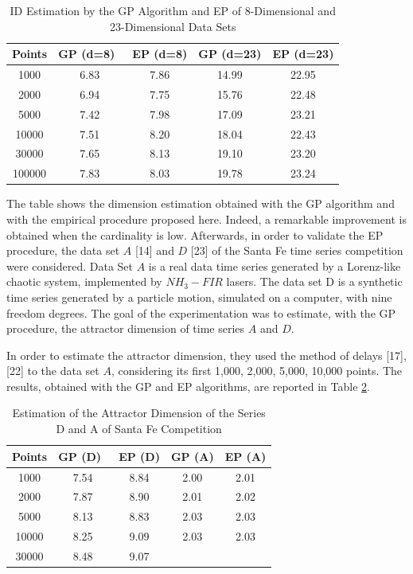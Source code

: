 \documentclass[journal]{IEEEtran}
\begin{document}
\begin{table}[!t]
  \renewcommand{\arraystretch}{2.5}
  \caption{ID Estimation by the GP Algorithm and EP of 8-Dimensional and 23-Dimensional Data Sets}
  \label{tbl_gp_ep_comp}
  \centering
  \begin{tabular}{c||c||c||c||c}
  \hline
  \bfseries Points & \bfseries GP (d=8)\ & \bfseries EP (d=8) & \bfseries GP (d=23) & \bfseries EP (d=23)\\
  \hline\hline
  1000 & 6.83 & 7.86 & 14.99 & 22.95\\
  2000 & 6.94 & 7.75 & 15.76 & 22.48\\
  5000 & 7.42 & 7.98 & 17.09 & 23.21\\
  10000 & 7.51 & 8.20 & 18.04 & 22.43\\
  30000 & 7.65 & 8.13 & 19.10 & 23.20\\
  100000 & 7.83 & 8.03 & 19.78 & 23.24\\
  \hline
  \end{tabular}
\end{table}


The table shows the dimension estimation obtained with the GP algorithm and with the empirical procedure proposed here.
Indeed, a remarkable improvement is obtained when the cardinality is low. Afterwards, in order to validate the EP procedure, 
the data set \(A\) [14] and \(D\) [23] of the Santa Fe time series competition were considered.
Data Set \(A\) is a real data time series generated by a Lorenz-like chaotic system, implemented by \(NH_3-FIR\) lasers. 
The data set D is a synthetic time series generated by a particle motion, simulated on a computer, with nine freedom degrees. 
The goal of the experimentation was to estimate, with the GP procedure, the attractor dimension of time series \(A\) and \(D\).

In order to estimate the attractor dimension, they used the method of delays [17], [22] to the data set \(A\), 
considering its first 1,000, 2,000, 5,000, 10,000 points. The results, obtained with the GP and EP algorithms, are reported in Table \ref{tbl_gp_ep_santa}. 



\begin{table}[!t]
  \renewcommand{\arraystretch}{2.5}
  \caption{Estimation of the Attractor Dimension of the Series D and A of Santa Fe Competition}
  \label{tbl_gp_ep_santa}
  \centering
  \begin{tabular}{c||c||c||c||c}
  \hline
  \bfseries Points & \bfseries GP (D)\ & \bfseries EP (D) & \bfseries GP (A) & \bfseries EP (A)\\
  \hline\hline
  1000 & 7.54 & 8.84 & 2.00 & 2.01\\
  2000 & 7.87 & 8.90 & 2.01 & 2.02\\
  5000 & 8.13 & 8.83 & 2.03 & 2.03\\
  10000 & 8.25 & 9.09 & 2.03 & 2.03\\
  30000 & 8.48 & 9.07\\
  \hline
  \end{tabular}
\end{table}
\end{document}
